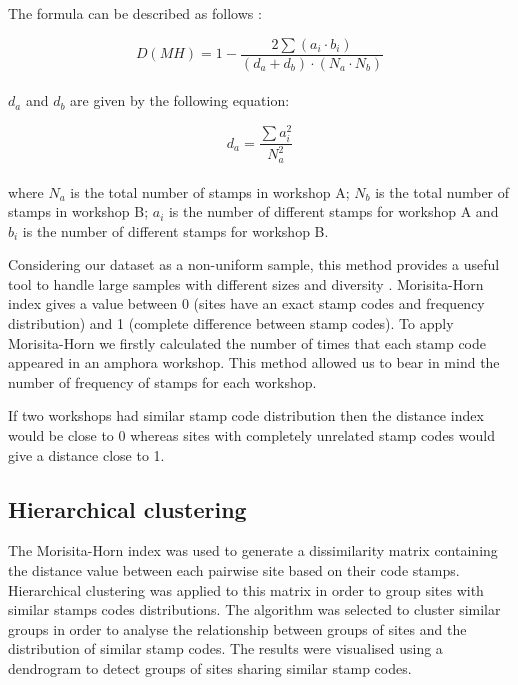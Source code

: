 \documentclass[review]{elsarticle}
\newcommand{\memo}[2]{\textcolor{#1}{#2}}
\newcommand{\xavi}[1]{\memo{magenta}{XRC: #1\\}}
\begin{document}
The formula can be described as follows \citep{magurran_measuring_2013}:

\begin{equation}
D(MH) = 1- \frac{2 \sum(a_{i} \cdot b_{i})}{(d_{a} + d_{b}) \cdot (N_{a} \cdot N_{b})}
\end{equation} \\

$d_{a}$ and $d_{b}$ are given by the following equation:

\begin{equation}
d_{a} = \frac{\sum a_{i}^{2}}{N_{a}^{2}} 
\end{equation} \\

where $N_{a}$ is the total number of stamps in workshop A; $N_{b}$ is the total number of stamps in workshop B; $a_{i}$ is the number of different stamps for workshop A and $b_{i}$ is the number of different stamps for workshop B.

Considering our dataset as a non-uniform sample, this method provides a useful tool to handle large samples with different sizes and diversity \citep{wolda_similarity_1981}. Morisita-Horn index gives a value between 0 (sites have an exact stamp codes and frequency distribution) and 1 (complete difference between stamp codes). To apply Morisita-Horn we firstly calculated the number of times that each stamp code appeared in an amphora workshop. 
This method allowed us to bear in mind the number of frequency of stamps for each workshop. 

If two workshops had similar stamp code distribution then the distance index would be close to 0 whereas sites with completely unrelated stamp codes would give a distance close to 1.

\subsection{Hierarchical clustering}

The Morisita-Horn index was used to generate a dissimilarity matrix containing the distance value between each pairwise site based on their code stamps. Hierarchical clustering was applied to this matrix in order to group sites with similar stamps codes distributions. The algorithm was selected to cluster similar groups in order to analyse the relationship between groups of sites and the distribution of similar stamp codes. The results were visualised using a dendrogram to detect groups of sites sharing similar stamp codes.  
\end{document}

